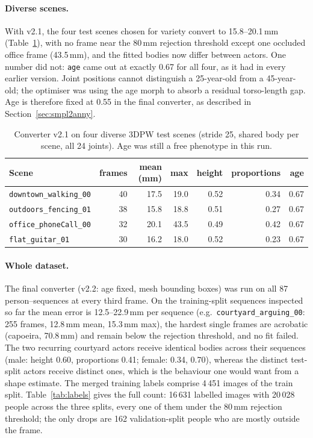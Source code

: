 \paragraph{Diverse scenes.} With v2.1, the four test scenes chosen for
variety convert to 15.8--20.1\,mm (Table~\ref{tab:fit_scenes}), with no frame
near the 80\,mm rejection threshold except one occluded office frame
(43.5\,mm), and the fitted bodies now differ between actors. One number did
not: \texttt{age} came out at exactly 0.67 for all four, as it had in every
earlier version. Joint positions cannot distinguish a 25-year-old from a
45-year-old; the optimiser was using the age morph to absorb a residual
torso-length gap. Age is therefore fixed at 0.55 in the final converter, as
described in Section~\ref{sec:smpl2anny}.

\begin{table}[h]
\centering\small
\begin{tabular}{lrrrrrr}
\toprule
Scene & frames & mean (mm) & max & height & proportions & age \\
\midrule
\texttt{downtown\_walking\_00} & 40 & 17.5 & 19.0 & 0.52 & 0.34 & 0.67 \\
\texttt{outdoors\_fencing\_01} & 38 & 15.8 & 18.8 & 0.51 & 0.27 & 0.67 \\
\texttt{office\_phoneCall\_00} & 32 & 20.1 & 43.5 & 0.49 & 0.42 & 0.67 \\
\texttt{flat\_guitar\_01} & 30 & 16.2 & 18.0 & 0.52 & 0.23 & 0.67 \\
\bottomrule
\end{tabular}
\caption{Converter v2.1 on four diverse 3DPW test scenes (stride 25, shared
body per scene, all 24 joints). Age was still a free phenotype in this run.}
\label{tab:fit_scenes}
\end{table}

\paragraph{Whole dataset.} The final converter (v2.2: age fixed, mesh
bounding boxes) was run on all 87 person--sequences at every third frame.
On the training-split sequences inspected so far the mean error is
12.5--22.9\,mm per sequence (e.g.\ \texttt{courtyard\_arguing\_00}: 255 frames,
12.8\,mm mean, 15.3\,mm max), the hardest single frames are acrobatic
(capoeira, 70.8\,mm) and remain below the rejection threshold, and no fit
failed. The two recurring courtyard actors receive identical bodies across
their sequences (male: height 0.60, proportions 0.41; female: 0.34, 0.70),
whereas the distinct test-split actors receive distinct ones, which is the
behaviour one would want from a shape estimate. The merged training labels
comprise 4\,451 images of the train split. Table~\ref{tab:labels} gives the
full count: 16\,631 labelled images with 20\,028 people across the three
splits, every one of them under the 80\,mm rejection threshold; the only
drops are 162 validation-split people who are mostly outside the frame.

